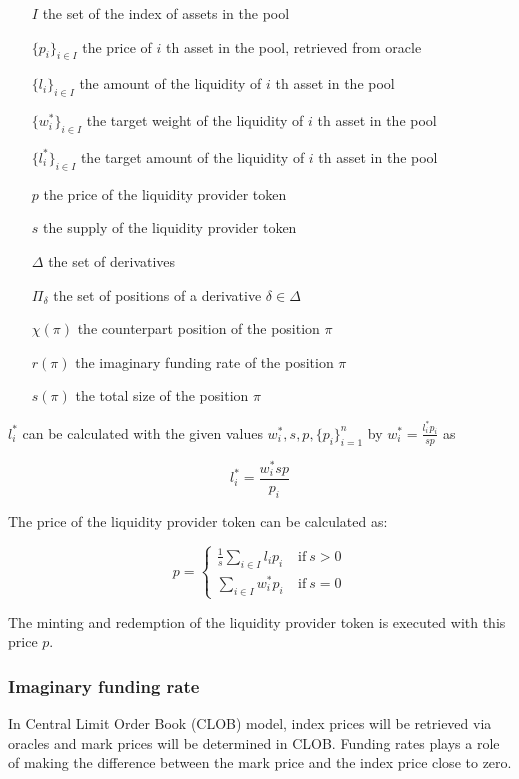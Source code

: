\documentclass[dvipdfmx]{jsarticle}
\begin{document}
\begin{itemize}
  \item[$I$] the set of the index of assets in the pool
  \item[$\{p_i\}_{i \in I}$] the price of $i$ th asset in the pool, retrieved from oracle
  \item[$\{l_i\}_{i \in I}$] the amount of the liquidity of $i$ th asset in the pool
  \item[$\{w_i^*\}_{i \in I}$] the target weight of the liquidity of $i$ th asset in the pool
  \item[$\{l_i^*\}_{i \in I}$] the target amount of the liquidity of $i$ th asset in the pool
  \item[$p$] the price of the liquidity provider token
  \item[$s$] the supply of the liquidity provider token
  \item[$\Delta$] the set of derivatives 
  \item[$\Pi_\delta$] the set of positions of a derivative $\delta \in \Delta$
  \item[$\chi(\pi)$] the counterpart position of the position $\pi$
  \item[$r(\pi)$] the imaginary funding rate of the position $\pi$
  \item[$s(\pi)$] the total size of the position $\pi$
\end{itemize}

$l_i^*$ can be calculated with the given values $w_i^*, s, p, \{p_i\}_{i=1}^n$ by $w_i^* = \frac{l_i^* p_i}{s p}$ as

$$
  l_i^* = \frac{w_i^* s p}{p_i}
$$

The price of the liquidity provider token can be calculated as:

$$
  p = \left\{
    \begin{aligned}
      \frac{1}{s} \sum_{i \in I} l_i p_i & \ \text{if} \ s > 0 \\
      \sum_{i \in I} w_i^* p_i & \ \text{if} \ s = 0
    \end{aligned}
  \right.
$$

The minting and redemption of the liquidity provider token is executed with this price $p$.

\subsubsection{Imaginary funding rate}

In Central Limit Order Book (CLOB) model, index prices will be retrieved via oracles and mark prices will be determined in CLOB.
Funding rates plays a role of making the difference between the mark price and the index price close to zero.
\end{document}
